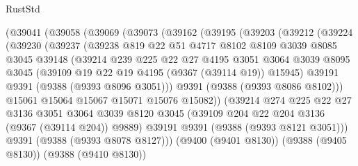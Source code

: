 \begin{lexlean}{RustStd}
\begin{coremodule}
          (@39041
            (@39058
              (@39069
                (@39073
                  (@39162
                    (@39195
                      (@39203
                        (@39212
                          (@39224
                            (@39230
                              (@39237
                                (@39238
                                  @819
                                  @22
                                  @51
                                  @4717
                                  @8102
                                  @8109
                                  @3039
                                  @8085
                                  @3045
                                  @39148
                                  (@39214
                                    @239
                                    @225
                                    @22
                                    @27
                                    @4195
                                    @3051
                                    @3064
                                    @3039
                                    @8095
                                    @3045
                                    (@39109 @19 @22 @19 @4195 (@9367 (@39114 @19)) @15945)
                                    @39191
                                    @9391
                                    (@9388 (@9393 @8096 @3051)))
                                  @9391
                                  (@9388 (@9393 @8086 @8102)))
                                @15061
                                @15064
                                @15067
                                @15071
                                @15076
                                @15082))
                            (@39214
                              @274
                              @225
                              @22
                              @27
                              @3136
                              @3051
                              @3064
                              @3039
                              @8120
                              @3045
                              (@39109 @204 @22 @204 @3136 (@9367 (@39114 @204)) @9889)
                              @39191
                              @9391
                              (@9388 (@9393 @8121 @3051)))
                            @9391
                            (@9388 (@9393 @8078 @8127)))
                          (@9400 (@9401 @8130))
                          (@9388 (@9405 @8130))
                          (@9388 (@9410 @8130))

\end{coremodule}
\end{lexlean}
